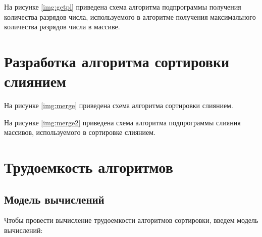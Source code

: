 
На рисунке \ref{img:getpl} приведена схема алгоритма подпрограммы получения количества разрядов числа, используемого в алгоритме получения максимального количества разрядов числа в массиве.


\pagebreak

\section{Разработка алгоритма сортировки слиянием}

На рисунке \ref{img:merge} приведена схема алгоритма сортировки слиянием.


\pagebreak

На рисунке \ref{img:merge2} приведена схема алгоритма подпрограммы слияния массивов, используемого в сортировке слиянием.


\pagebreak

\section{Трудоемкость алгоритмов}

\subsection{Модель вычислений}

Чтобы провести вычисление трудоемкости алгоритмов сортировки, введем модель вычислений:

